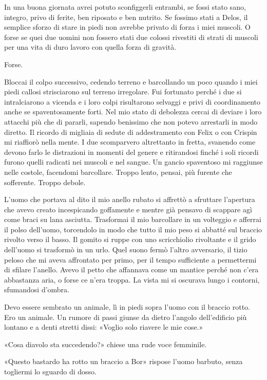 In una buona giornata avrei potuto sconfiggerli entrambi, se fossi stato
sano, integro, privo di ferite, ben riposato e ben nutrito. Se fossimo
stati a Delos, il semplice sforzo di stare in piedi non avrebbe privato
di forza i miei muscoli. O forse se quei due uomini non fossero stati
due colossi rivestiti di strati di muscoli per una vita di duro lavoro
con quella forza di gravità.

Forse.

Bloccai il colpo successivo, cedendo terreno e barcollando un poco
quando i miei piedi callosi strisciarono sul terreno irregolare. Fui
fortunato perché i due si intralciarono a vicenda e i loro colpi
risultarono selvaggi e privi di coordinamento anche se spaventosamente
forti. Nel mio stato di debolezza cercai di deviare i loro attacchi più
che di pararli, sapendo benissimo che non potevo arrestarli in modo
diretto. Il ricordo di migliaia di sedute di addestramento con Felix o
con Crispin mi riaffiorò nella mente. I due scomparvero altrettanto in
fretta, svanendo come devono farlo le distrazioni in momenti del genere
e ritirandosi finché i soli ricordi furono quelli radicati nei muscoli e
nel sangue. Un gancio spaventoso mi raggiunse nelle costole, facendomi
barcollare. Troppo lento, pensai, più furente che sofferente. Troppo
debole.

L'uomo che portava al dito il mio anello rubato si affrettò a sfruttare
l'apertura che avevo creato incespicando goffamente e mentre già pensavo
di scappare agì come braci su lana asciutta. Trasformai il mio
barcollare in un volteggio e afferrai il polso dell'uomo, torcendolo in
modo che tutto il mio peso si abbatté sul braccio rivolto verso il
basso. Il gomito si ruppe con uno scricchiolio rivoltante e il grido
dell'uomo si trasformò in un urlo. Quel suono fermò l'altro avversario,
il tizio peloso che mi aveva affrontato per primo, per il tempo
sufficiente a permettermi di sfilare l'anello. Avevo il petto che
affannava come un mantice perché non c'era abbastanza aria, o forse ce
n'era troppa. La vista mi si oscurava lungo i contorni, sfumandosi
d'ombra.

Devo essere sembrato un animale, lì in piedi sopra l'uomo con il braccio
rotto. Ero un animale. Un rumore di passi giunse da dietro l'angolo
dell'edificio più lontano e a denti stretti dissi: «Voglio solo riavere
le mie cose.»

«Cosa diavolo sta succedendo?» chiese una rude voce femminile.

«Questo bastardo ha rotto un braccio a Bor» rispose l'uomo barbuto,
senza togliermi lo sguardo di dosso.

